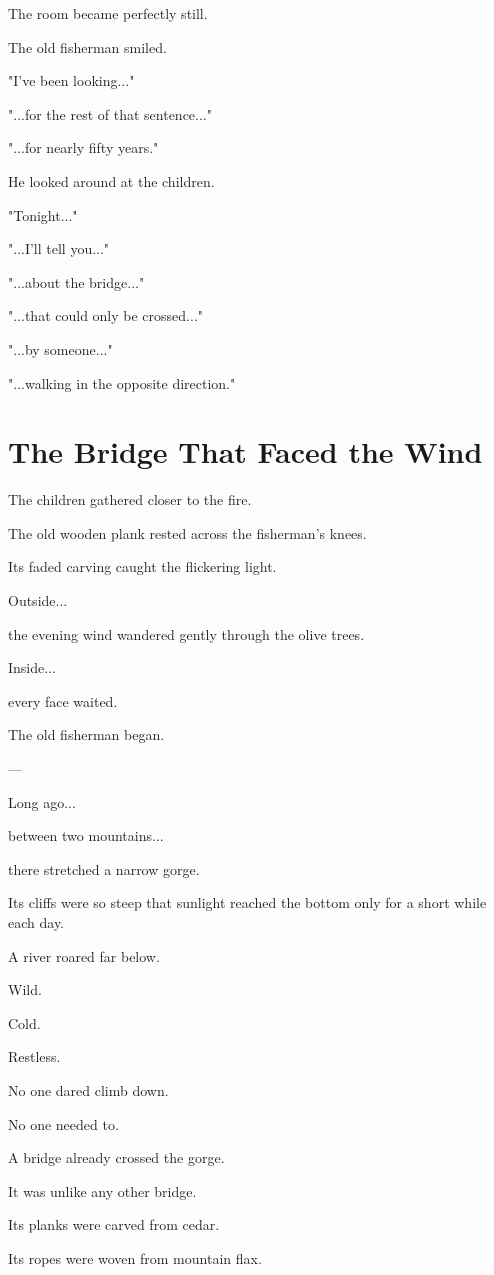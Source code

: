 \documentclass[12pt,openany]{book}
\begin{document}
The room became perfectly still.

The old fisherman smiled.

"I've been looking..."

"...for the rest of that sentence..."

"...for nearly fifty years."

He looked around at the children.

"Tonight..."

"...I'll tell you..."

"...about the bridge..."

"...that could only be crossed..."

"...by someone..."

"...walking in the opposite direction."
\section*{The Bridge That Faced the Wind}

The children gathered closer to the fire.

The old wooden plank rested across the fisherman's knees.

Its faded carving caught the flickering light.

Outside...

the evening wind wandered gently through the olive trees.

Inside...

every face waited.

The old fisherman began.

---

Long ago...

between two mountains...

there stretched a narrow gorge.

Its cliffs were so steep that sunlight reached the bottom only for a short while each day.

A river roared far below.

Wild.

Cold.

Restless.

No one dared climb down.

No one needed to.

A bridge already crossed the gorge.

It was unlike any other bridge.

Its planks were carved from cedar.

Its ropes were woven from mountain flax.
\end{document}
